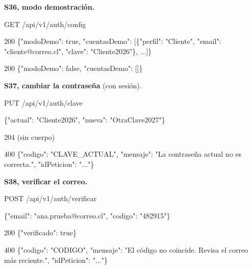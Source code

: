 \textbf{S36, modo demostración.}


\begin{codigo}
GET /\allowbreak{}api/\allowbreak{}v1/\allowbreak{}auth/\allowbreak{}config\par
\end{codigo}

\begin{codigo}
200 \{"modoDemo":\allowbreak{} true,\allowbreak{} "cuentasDemo":\allowbreak{} [\allowbreak{}\{"perfil":\allowbreak{} "Cliente",\allowbreak{} "email":\allowbreak{} "cliente@correo.\allowbreak{}cl",\allowbreak{} "clave":\allowbreak{} "Cliente2026"\},\allowbreak{} .\allowbreak{}.\allowbreak{}.\allowbreak{}]\}\par
200 \{"modoDemo":\allowbreak{} false,\allowbreak{} "cuentasDemo":\allowbreak{} [\allowbreak{}]\}\par
\end{codigo}

\textbf{S37, cambiar la contraseña} (con sesión).


\begin{codigo}
PUT /\allowbreak{}api/\allowbreak{}v1/\allowbreak{}auth/\allowbreak{}clave\par
\{"actual":\allowbreak{} "Cliente2026",\allowbreak{} "nueva":\allowbreak{} "OtraClave2027"\}\par
\end{codigo}

\begin{codigo}
204 (\allowbreak{}sin cuerpo)\par
400 \{"codigo":\allowbreak{} "CLAVE\_\allowbreak{}ACTUAL",\allowbreak{} "mensaje":\allowbreak{} "La contraseña actual no es correcta.\allowbreak{}",\allowbreak{} "idPeticion":\allowbreak{} ".\allowbreak{}.\allowbreak{}.\allowbreak{}"\}\par
\end{codigo}

\textbf{S38, verificar el correo.}


\begin{codigo}
POST /\allowbreak{}api/\allowbreak{}v1/\allowbreak{}auth/\allowbreak{}verificar\par
\{"email":\allowbreak{} "ana.\allowbreak{}prueba@correo.\allowbreak{}cl",\allowbreak{} "codigo":\allowbreak{} "482915"\}\par
\end{codigo}

\begin{codigo}
200 \{"verificado":\allowbreak{} true\}\par
400 \{"codigo":\allowbreak{} "CODIGO",\allowbreak{} "mensaje":\allowbreak{} "El código no coincide.\allowbreak{} Revisa el correo más reciente.\allowbreak{}",\allowbreak{} "idPeticion":\allowbreak{} ".\allowbreak{}.\allowbreak{}.\allowbreak{}"\}\par
\end{codigo}

